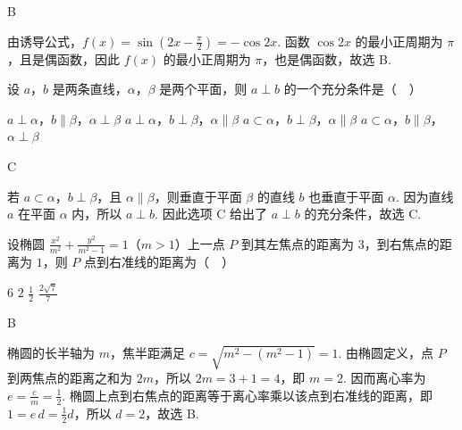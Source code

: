 \begin{answer}
B
\end{answer}

\begin{solution}
由诱导公式，\(f(x)=\sin\left(2x-\frac{\pi}{2}\right)=-\cos 2x\).
函数 \(\cos 2x\) 的最小正周期为 \(\pi\)，且是偶函数，因此 \(f(x)\) 的最小正周期为 \(\pi\)，也是偶函数，故选 B.
\end{solution}

\begin{problem}
设 \(a\)，\(b\) 是两条直线，\(\alpha\)，\(\beta\) 是两个平面，则 \(a \perp b\) 的一个充分条件是（\(\quad\)）

\choices
    {\(a \perp \alpha\)，\(b \parallel \beta\)，\(\alpha \perp \beta\)}
    {\(a \perp \alpha\)，\(b \perp \beta\)，\(\alpha \parallel \beta\)}
    {\(a \subset \alpha\)，\(b \perp \beta\)，\(\alpha \parallel \beta\)}
    {\(a \subset \alpha\)，\(b \parallel \beta\)，\(\alpha \perp \beta\)}
\end{problem}

\begin{answer}
C
\end{answer}

\begin{solution}
若 \(a\subset\alpha\)，\(b\perp\beta\)，且 \(\alpha\parallel\beta\)，则垂直于平面 \(\beta\) 的直线 \(b\) 也垂直于平面 \(\alpha\). 因为直线 \(a\) 在平面 \(\alpha\) 内，所以 \(a\perp b\). 因此选项 C 给出了 \(a\perp b\) 的充分条件，故选 C.
\end{solution}

\begin{problem}
设椭圆 \(\frac{x^2}{m^2} + \frac{y^2}{m^2 - 1} = 1\)（\(m > 1\)）上一点 \(P\) 到其左焦点的距离为 \(3\)，到右焦点的距离为 \(1\)，则 \(P\) 点到右准线的距离为（\(\quad\)）

\choices
    {\(6\)}
    {\(2\)}
    {\(\frac{1}{2}\)}
    {\(\frac{2\sqrt{7}}{7}\)}
\end{problem}

\begin{answer}
B
\end{answer}

\begin{solution}
椭圆的长半轴为 \(m\)，焦半距满足 \(c=\sqrt{m^2-(m^2-1)}=1\). 由椭圆定义，点 \(P\) 到两焦点的距离之和为 \(2m\)，所以 \(2m=3+1=4\)，即 \(m=2\). 因而离心率为 \(e=\frac{c}{m}=\frac12\). 椭圆上点到右焦点的距离等于离心率乘以该点到右准线的距离，即 \(1=e\,d=\frac12d\)，所以 \(d=2\)，故选 B.
\end{solution}

